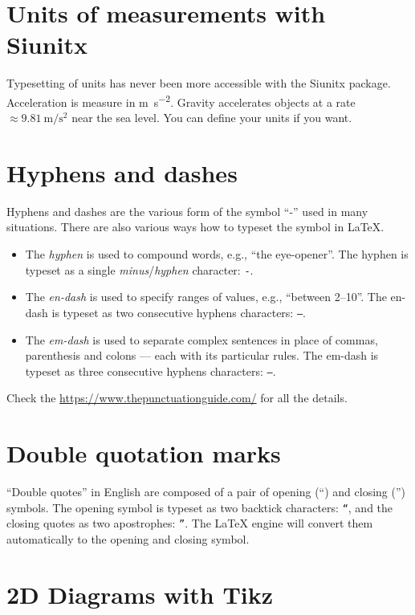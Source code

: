 \section{Units of measurements with Siunitx}

Typesetting of units has never been more accessible with the Siunitx package.
Acceleration is measure in \si{\meter\per\second\squared}.
Gravity accelerates objects at a rate $\approx \SI{9.81}{\meter\per\second\squared}$ near the sea level.
You can define your units if you want.

\section{Hyphens and dashes}

Hyphens and dashes are the various form of the symbol ``-'' used in many situations.
There are also various ways how to typeset the symbol in LaTeX.
\begin{itemize}
  \item The \emph{hyphen} is used to compound words, e.g., ``the eye-opener''. The hyphen is typeset as a single \emph{minus}/\emph{hyphen} character: \texttt{-}.
  \item The \emph{en-dash} is used to specify ranges of values, e.g., ``between 2--10''. The en-dash is typeset as two consecutive hyphens characters: \texttt{--}.
  \item The \emph{em-dash} is used to separate complex sentences in place of commas, parenthesis and colons --- each with its particular rules. The em-dash is typeset as three consecutive hyphens characters: \texttt{---}.
\end{itemize}
Check the \url{https://www.thepunctuationguide.com/} for all the details.

\section{Double quotation marks}

``Double quotes'' in English are composed of a pair of opening (``) and closing ('') symbols.
The opening symbol is typeset as two backtick characters: \texttt{``}, and the closing quotes as two apostrophes: \texttt{''}.
The LaTeX engine will convert them automatically to the opening and closing symbol.

\section{2D Diagrams with Tikz}

